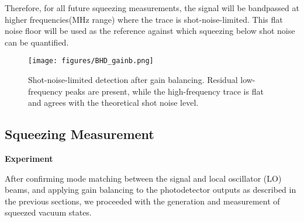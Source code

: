 \documentclass[colorlinks=true,pdfstartview=FitV,linkcolor=blue,
citecolor=red,urlcolor=magenta]{ligodoc}
\begin{document}
Therefore, for all future squeezing measurements, the signal will be bandpassed at higher frequencies(MHz range) where the trace is shot-noise-limited. This flat noise floor will be used as the reference against which squeezing below shot noise can be quantified.

\begin{figure}[H]
    \centering
    \texttt{[image: figures/BHD\_gainb.png]}
    \caption{Shot-noise-limited detection after gain balancing. Residual low-frequency peaks are present, while the high-frequency trace is flat and agrees with the theoretical shot noise level.}
    \label{fig:enter-label}
\end{figure}



\subsection{Squeezing Measurement}
\textbf{Experiment}

After confirming mode matching between the signal and local oscillator (LO) beams, and applying gain balancing to the photodetector outputs as described in the previous sections, we proceeded with the generation and measurement of squeezed vacuum states.
\end{document}
